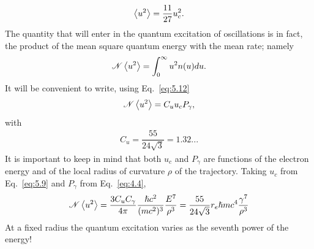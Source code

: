 \begin{align}
	\left< u^2 \right> = \dfrac{11}{27} u_c^2.
\end{align}
The quantity that will enter in the quantum excitation of oscillations is in fact, the product of the mean square quantum energy with the mean rate; namely
\begin{align} \label{eq:5.17}
	\mathscr{N} \left< u^2 \right> = \int_0^\infty u^2 n(u) du.
\end{align}
It will be convenient to write, using Eq.~\eqref{eq:5.12}
\begin{align} \label{eq:5.18}
	\mathscr{N} \left< u^2 \right> = C_u u_c P_\gamma,
\end{align}
with
\begin{align}
	C_u = \dfrac{55}{24\sqrt{3}} = 1.32...
\end{align}
It is important to keep in mind that both $u_c$ and $P_\gamma$ are functions of the electron
energy and of the local radius of curvature $\rho$ of the trajectory. Taking $u_c$ from Eq.~\eqref{eq:5.9} and $P_\gamma$ from Eq.~\eqref{eq:4.4},
\begin{align}
	\mathscr{N} \left< u^2 \right> = \dfrac{3 C_u C_\gamma}{4 \pi} \dfrac{\hslash c^2}{(mc^2)^3} \dfrac{E^7}{\rho^3} = \dfrac{55}{24\sqrt{3}} r_e \hslash mc^4 \dfrac{\gamma^7}{\rho^3}
\end{align}
At a fixed radius the quantum excitation varies as the seventh power of the energy!




